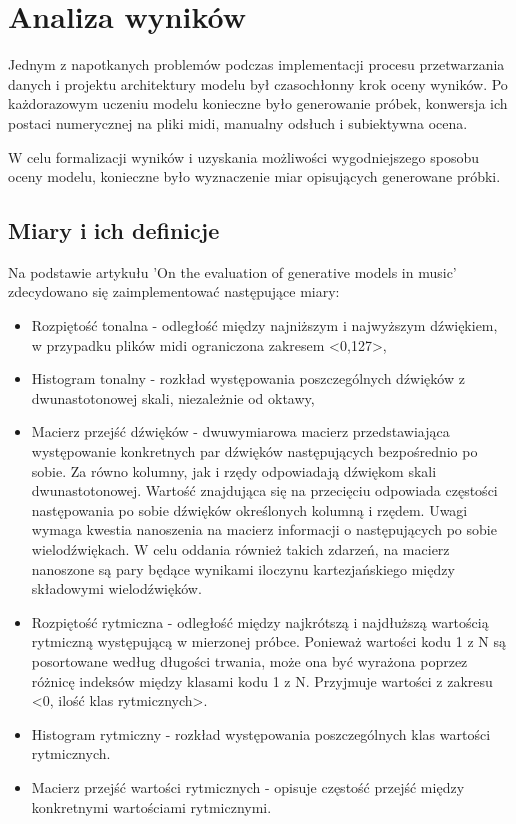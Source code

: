 \chapter{Analiza wyników}
{

    Jednym z\,\,napotkanych problemów podczas implementacji procesu przetwarzania danych i\,\,projektu architektury modelu
    był czasochłonny krok oceny wyników. Po każdorazowym uczeniu modelu konieczne było generowanie próbek, 
    konwersja ich postaci numerycznej na pliki midi, manualny odsłuch i\,\,subiektywna ocena.

    W\,\,celu formalizacji wyników i\,\,uzyskania możliwości wygodniejszego sposobu oceny modelu, konieczne było wyznaczenie
    miar opisujących generowane próbki. 

    \section{Miary i\,\,ich definicje}
    {
        Na podstawie artykułu 'On the evaluation of generative models in music'\cite{Yang2018OnTE} zdecydowano się zaimplementować następujące miary:
        \begin{itemize}
            \setlength\itemsep{-0.5em}
            \item Rozpiętość tonalna - odległość między najniższym i\,\,najwyższym dźwiękiem, w\,\,przypadku plików midi ograniczona
            zakresem <0,127>,
            \item Histogram tonalny - rozkład występowania poszczególnych dźwięków z\,\,dwunastotonowej skali, niezależnie od oktawy, 
            \item Macierz przejść dźwięków - dwuwymiarowa macierz przedstawiająca występowanie konkretnych par dźwięków następujących
            bezpośrednio po sobie. Za równo kolumny, jak i rzędy odpowiadają dźwiękom skali dwunastotonowej. 
            Wartość znajdująca się na przecięciu odpowiada częstości następowania po sobie dźwięków określonych kolumną i rzędem. 
            Uwagi wymaga kwestia nanoszenia na macierz informacji o\,\,następujących po sobie wielodźwiękach. W\,\,celu oddania
            również takich zdarzeń, na macierz nanoszone są pary będące wynikami iloczynu kartezjańskiego między składowymi wielodźwięków.
            \item Rozpiętość rytmiczna - odległość między najkrótszą i\,\,najdłuższą wartością rytmiczną występującą w\,\,mierzonej próbce. 
            Ponieważ wartości kodu 1 z\,\,N są posortowane według długości trwania, może ona być wyrażona poprzez różnicę indeksów 
            między klasami kodu 1 z\,\,N. Przyjmuje wartości z\,\,zakresu <0, ilość klas rytmicznych>.
            \item Histogram rytmiczny - rozkład występowania poszczególnych klas wartości rytmicznych.
            \item Macierz przejść wartości rytmicznych - opisuje częstość przejść między konkretnymi wartościami rytmicznymi.
        \end{itemize}

}}
